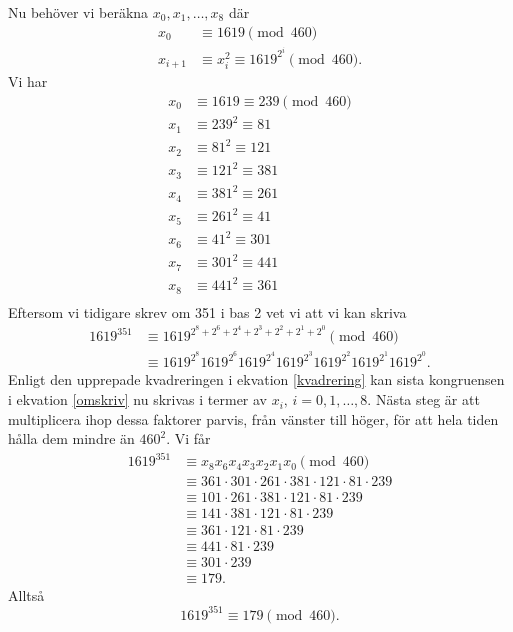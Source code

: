 \documentclass{article}
\begin{document}
\begin{enumerate}[label=(\alph*)]
		Nu behöver vi beräkna $x_0, x_1, \ldots, x_{8}$ där
		\begin{align*}
			x_0 &\equiv 1619 \pmod{460}\\
			x_{i+1} &\equiv x_i^2 \equiv 1619^{2^{i}} \pmod{460}.
		\end{align*}
		Vi har
		\begin{equation}
			\label{kvadrering}
			\begin{aligned}
				x_0 &\equiv 1619 \equiv 239 \pmod{460}\\
				x_1 &\equiv 239^{2} \equiv 81\\
				x_2 &\equiv 81^{2} \equiv 121\\
				x_3 &\equiv 121^{2} \equiv 381\\
				x_4 &\equiv 381^{2} \equiv 261\\
				x_5 &\equiv 261^{2} \equiv 41\\
				x_6 &\equiv 41^{2} \equiv 301\\
				x_7 &\equiv 301^{2} \equiv 441\\
				x_8 &\equiv 441^{2} \equiv 361\\
			\end{aligned}
		\end{equation}
		Eftersom vi tidigare skrev om 351 i bas 2 vet vi att vi kan skriva
		\begin{equation}
			\label{omskriv}
			\begin{aligned}
				1619^{351} &\equiv 1619^{2^{8} + 2^{6} + 2^{4} + 2^{3} + 2^{2} + 2^{1} + 2^{0}} \pmod{460}\\
					   &\equiv 1619^{2^{8}}1619^{2^{6}}1619^{2^{4}}1619^{2^{3}}1619^{2^{2}}1619^{2^{1}}1619^{2^{0}}.
			\end{aligned}
		\end{equation}
		Enligt den upprepade kvadreringen i ekvation \ref{kvadrering} kan sista kongruensen i ekvation \ref{omskriv} nu skrivas i termer av $x_i, \, i = 0, 1, \ldots, 8$. Nästa steg är att multiplicera ihop dessa faktorer parvis, från vänster till höger, för att hela tiden hålla dem mindre än $460^{2}$. Vi får
		\begin{align*}
			1619^{351} &\equiv x_8 x_6 x_4 x_3 x_2 x_1 x_0 \pmod{460}\\
				   &\equiv 361 \cdot 301 \cdot 261 \cdot 381 \cdot 121 \cdot 81 \cdot 239\\
				   &\equiv 101 \cdot 261 \cdot 381 \cdot 121 \cdot 81 \cdot 239\\
				   &\equiv 141 \cdot 381 \cdot 121 \cdot 81 \cdot 239\\
				   &\equiv 361 \cdot 121 \cdot 81 \cdot 239\\
				   &\equiv 441 \cdot 81 \cdot 239\\
				   &\equiv 301 \cdot 239\\
				   &\equiv 179.
		\end{align*}
		Alltså
		\[
			1619^{351} \equiv 179 \pmod{460}
		.\] 


\end{enumerate}
\end{document}
